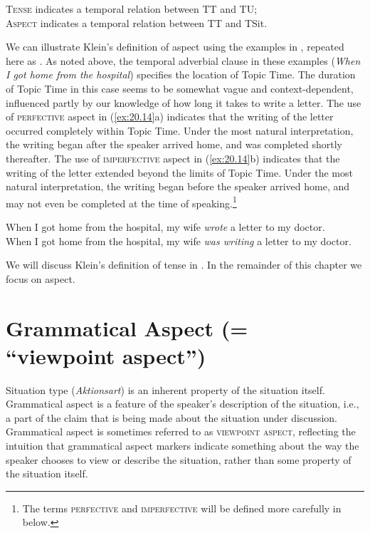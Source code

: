 \ea \label{ex:20.13}
\ea  \textsc{Tense} indicates a temporal relation between TT and TU;\\
\ex \textsc{Aspect} indicates a temporal relation between TT and TSit.
\z \z


We can illustrate Klein’s definition of aspect using the examples in , repeated here as . As noted above, the temporal adverbial clause in these examples (\textit{When I got home from the hospital}) specifies the location of Topic Time. The duration of Topic Time in this case seems to be somewhat vague and context-dependent, influenced partly by our knowledge of how long it takes to write a letter. The use of \textsc{perfective} aspect in (\ref{ex:20.14}a) indicates that the writing of the letter occurred completely within Topic Time. Under the most natural interpretation, the writing began after the speaker arrived home, and was completed shortly thereafter. The use of \textsc{imperfective} aspect in (\ref{ex:20.14}b) indicates that the writing of the letter extended beyond the limits of Topic Time. Under the most natural interpretation, the writing began before the speaker arrived home, and may not even be completed at the time of speaking.\footnote{The terms \textsc{perfective} and \textsc{imperfective} will be defined more carefully in  below.}


\ea \label{ex:20.14}
\ea  When I got home from the hospital, my wife \textit{wrote} a letter to my doctor.\\
\ex When I got home from the hospital, my wife \textit{was writing} a letter to my doctor.
                       \z
\z


We will discuss Klein’s definition of tense in . In the remainder of this chapter we focus on aspect.


\section{Grammatical Aspect (= “viewpoint aspect”)}\label{sec:20.4} 

Situation type (\textit{Aktionsart}) is an inherent property of the situation itself. Grammatical aspect is a feature of the speaker’s description of the situation, i.e., a part of the claim that is being made about the situation under discussion. Grammatical aspect is sometimes referred to as \textsc{viewpoint aspect}, reflecting the intuition that grammatical aspect markers indicate something about the way the speaker chooses to view or describe the situation, rather than some property of the situation itself.



